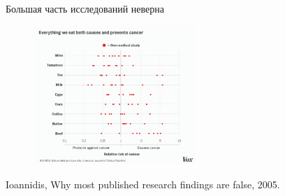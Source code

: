 \documentclass[9pt,pdf,utf8,hyperref={unicode},aspectratio=169]{beamer}
\begin{document}
\begin{frame}{Большая часть исследований неверна}
    \begin{figure}
    	\includegraphics[width=0.55\textwidth]{Medical_studies.png}
    \end{figure}
	
	Ioannidis, Why most published research findings are false, 2005.
\end{frame}


%	
%	
%	
%	
\end{document}
